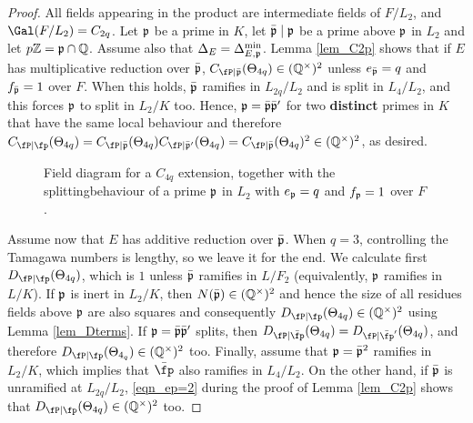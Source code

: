 \begin{proof}
    All fields appearing in the product are intermediate fields of $F/L_2$, and $\Gal(F/L_2)=C_{2q}$. Let $\mathfrak{p}$ be a prime in $K$, let $\bar{\mathfrak{p}}\mid\mathfrak{p}$ be a prime above $\mathfrak{p}$ in $L_2$ and let $p\mathbb{Z}=\mathfrak{p}\cap\mathbb{Q}$. Assume also that $\Delta_E=\Delta_{E,\mathfrak{p}}^{\min}$. Lemma \ref{lem_C2p} shows that if $E$ has multiplicative reduction over $\bar{\mathfrak{p}}$, $C_{\fP\mid\bar\pp}(\Theta_{4q})\in\QQss$ unless $e_{\bar{\mathfrak{p}}}=q$ and $f_{\bar{\mathfrak{p}}}=1$ over $F$. When this holds, $\bar{\mathfrak{p}}$ ramifies in $L_{2q}/L_2$ and is split in $L_4/L_2$, and this forces $\mathfrak{p}$ to split in $L_2/K$ too. Hence, $\mathfrak{p}=\bar{\mathfrak{p}}\bar{\mathfrak{p}}'$ for two \textbf{distinct} primes in $K$ that have the same local behaviour and therefore $\Cp(\Theta_{4q})=C_{\fP\mid\bar\pp}(\Theta_{4q})C_{\fP\mid\bar\pp'}(\Theta_{4q})=C_{\fP\mid\bar\pp}(\Theta_{4q})^2\in\QQss$, as desired.

    \begin{figure}[!ht]
        \centering
        \caption[short]{\centering Field diagram for a $C_{4q}$ extension, together with the splitting\newline behaviour of a prime $\mathfrak{p}$ in $L_2$ with $e_{\mathfrak{p}}=q$ and $f_{\mathfrak{p}}=1$ over $F$.}
    \end{figure}

    Assume now that $E$ has additive reduction over $\bar{\mathfrak{p}}$. When $q=3$, controlling the Tamagawa numbers is lengthy, so we leave it for the end. We calculate first $\Dp(\Theta_{4q})$, which is $1$ unless $\bar{\mathfrak{p}}$ ramifies in $L/F_2$ (equivalently, $\mathfrak{p}$ ramifies in $L/K$). If $\mathfrak{p}$ is inert in $L_2/K$, then $N(\bar{\mathfrak{p}})\in(\mathbb{Q}^{\times})^2$ and hence the size of all residues fields above $\mathfrak{p}$ are also squares and consequently $\Dp(\Theta_{4q})\in\QQss$ using Lemma \ref{lem_Dterms}. If $\mathfrak{p}=\bar{\mathfrak{p}}\bar{\mathfrak{p}}'$ splits, then $D_{\fP\mid\bar\fp}(\Theta_{4q})=D_{\fP\mid\bar\fp'}(\Theta_{4q})$, and therefore $\Dp(\Theta_{4_q})\in\QQss$ too. Finally, assume that $\mathfrak{p}=\bar{\mathfrak{p}}^2$ ramifies in $L_2/K$, which implies that $\bar\fp$ also ramifies in $L_4/L_2$. On the other hand, if $\bar{\mathfrak{p}}$ is unramified at $L_{2q}/L_2$, \eqref{eqn_ep=2} during the proof of Lemma \ref{lem_C2p} shows that $\Dp(\Theta_{4q})\in\QQss$ too. 


\end{proof}
